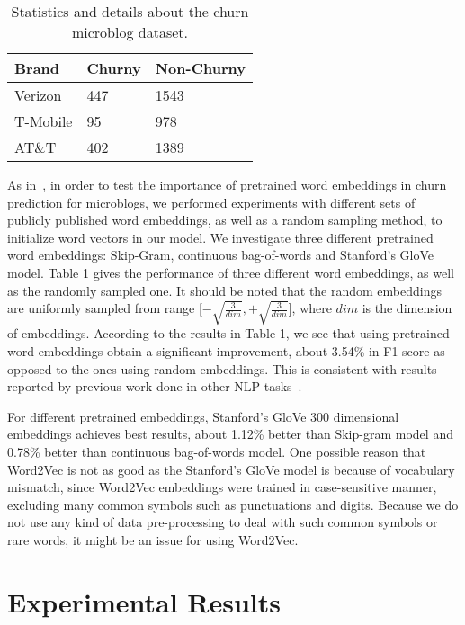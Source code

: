 \documentclass[11pt,letterpaper]{article}
\begin{document}
\begin{table}
\small
\centering
\begin{tabular}{|l|l|l|}
\hline \bf Brand & \bf Churny & \bf Non-Churny \\ \hline

Verizon &447	 & 1543 \\
T-Mobile & 95 & 978 \\
AT\&T & 402 & 1389 \\

\hline
\end{tabular}
\caption{Statistics and details about the churn microblog dataset.}
\end{table}


As in~\cite{collobert}, in order to test the importance of pretrained word embeddings in churn prediction for microblogs, we performed experiments with different sets of publicly published word embeddings, as well as a random sampling method, to initialize word vectors in our model. We investigate three different pretrained word embeddings: Skip-Gram, continuous bag-of-words and Stanford's GloVe model. Table 1 gives the performance of three different word embeddings, as well as the randomly sampled one. It should be noted that the random embeddings are uniformly sampled from range [\(-\sqrt{\frac{3}{dim}},+\sqrt{\frac{3}{dim}}\)], where \(dim\) is the dimension of embeddings. According to the results in Table 1, we see that using pretrained word embeddings obtain a significant improvement, about  3.54\% in F1 score as opposed to the ones using random embeddings. This is consistent with results reported by previous work done in other NLP tasks~\cite{collobert,huang2015,chiu2015named}.

For different pretrained embeddings, Stanford's GloVe 300 dimensional embeddings achieves best results, about 1.12\% better than Skip-gram model and  0.78\% better than continuous bag-of-words model. One possible reason that Word2Vec is not as good as the Stanford's GloVe model is because of vocabulary mismatch, since Word2Vec embeddings were trained in case-sensitive manner, excluding many common symbols such as punctuations and digits. Because we do not use any kind of data pre-processing  to deal with such common symbols or rare words, it might be an issue for using Word2Vec.

\section{Experimental Results}
\end{document}
